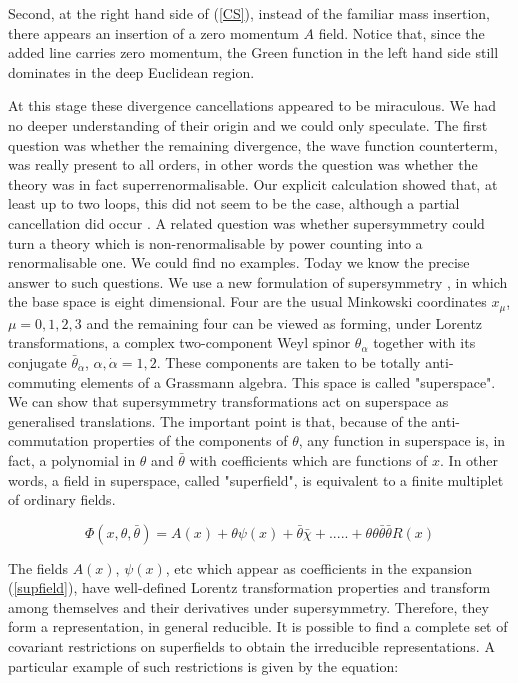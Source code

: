 \documentclass[a4paper,11pt]{article}
\begin{document}
Second, at the right hand side of (\ref{CS}), instead of the familiar mass insertion, 
there appears an insertion of a zero momentum $A$ field. Notice that, since the 
added line carries zero momentum, the Green function in the left hand side still 
dominates in the deep Euclidean region.

At this stage these divergence cancellations appeared to be miraculous.
We had no deeper understanding of their origin and we could only
speculate. The first question was whether the remaining divergence, the
wave function counterterm, was really present to all orders, in other
words the question was whether the theory was in fact
superrenormalisable. Our explicit calculation showed that, at least
up to two loops, this did not seem to be the case, although a partial
cancellation did occur \cite{IZ}. A related question was whether
supersymmetry could turn a  theory which is non-renormalisable by
power counting into a renormalisable one. We could find no examples.
Today we know the precise answer to such questions. We use a new
formulation of supersymmetry \cite{supspace}, in which
the base space is eight dimensional. Four are the usual Minkowski
coordinates $x_{\mu}$, $\mu = 0,1,2,3$ and the remaining four can be
viewed as forming, under Lorentz transformations,  a complex
two-component Weyl spinor
${\theta}_{\alpha}$ together with its conjugate $\bar{\theta}_{\dot{\alpha}}$,
$\alpha , \dot{\alpha } = 1,2$. These components are taken to be totally
anti-commuting
elements of a Grassmann algebra. This space is called "superspace".
We can show that supersymmetry transformations act on superspace as
generalised translations.
The important point is that, because of the anti-commutation properties
of the components of $\theta$, any function in superspace is, in fact,
a polynomial in $\theta$ and $\bar{\theta}$ with coefficients which are
functions of $x$. In other words, a field in superspace, called
"superfield", is equivalent to a finite multiplet of ordinary fields.

\begin{equation}
\label{supfield}
\Phi (x, \theta , \bar{\theta} ) = A(x)+\theta \psi (x) + \bar{\theta}
\bar{\chi} +.....+\theta \theta \bar{\theta} \bar{\theta} R(x)
\end{equation}

The fields $A(x)$, $\psi (x)$, etc which appear as coefficients in
the expansion (\ref{supfield}), have well-defined Lorentz transformation
properties and transform among themselves and their derivatives under
supersymmetry. Therefore, they form a representation, in general
reducible. It is possible to find a complete set of covariant restrictions
on superfields to obtain the irreducible representations. A particular
example of such restrictions is given by the equation:
\end{document}
